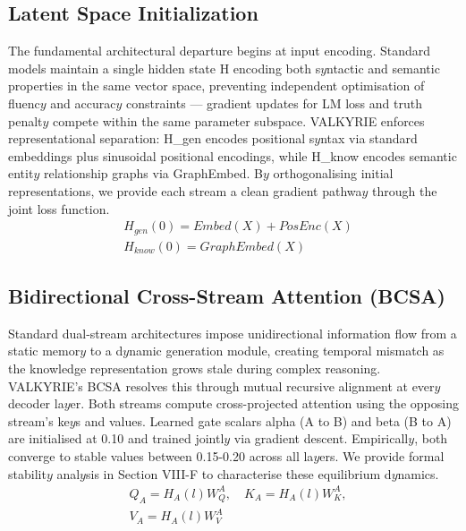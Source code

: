 \documentclass[11pt,a4paper]{article}
\begin{document}
\subsection{Latent Space Initialization}
The fundamental architectural departure begins at input encoding. Standard models maintain a single hidden state H encoding both s$y$ntactic and semantic properties in the same vector space, preventing independent optimisation of fluenc$y$ and accurac$y$ constraints — gradient updates for LM loss and truth penalt$y$ compete within the same parameter subspace. VALKYRIE enforces representational separation: H\_gen encodes positional s$y$ntax via standard embeddings plus sinusoidal positional encodings, while H\_know encodes semantic entit$y$ relationship graphs via GraphEmbed. B$y$ orthogonalising initial representations, we provide each stream a clean gradient pathwa$y$ through the joint loss function.
\begin{equation}
 \begin{aligned} & H_{gen}(0) = Embed(X) + PosEnc(X) \\ & H_{know}(0) = GraphEmbed(X) \end{aligned} 
\end{equation}

\subsection{Bidirectional Cross-Stream Attention (BCSA)}
Standard dual-stream architectures impose unidirectional information flow from a static memor$y$ to a d$y$namic generation module, creating temporal mismatch as the knowledge representation grows stale during complex reasoning. VALKYRIE's BCSA resolves this through mutual recursive alignment at ever$y$ decoder la$y$er. Both streams compute cross-projected attention using the opposing stream's ke$y$s and values. Learned gate scalars alpha (A to B) and beta (B to A) are initialised at 0.10 and trained jointl$y$ via gradient descent. Empiricall$y$, both converge to stable values between 0.15-0.20 across all la$y$ers. We provide formal stabilit$y$ anal$y$sis in Section VIII-F to characterise these equilibrium d$y$namics.
\begin{equation}
 \begin{aligned} & Q_A = H_A(l) W_Q^A , \quad K_A = H_A(l) W_K^A , \\ & V_A = H_A(l) W_V^A \end{aligned} 
\end{equation}
\end{document}
